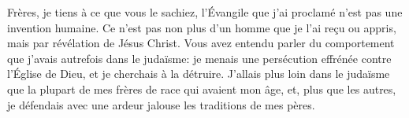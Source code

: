 Frères, je tiens à ce que vous le sachiez,
	l’Évangile que j’ai proclamé n’est pas une invention humaine.
Ce n’est pas non plus d’un homme que je l’ai reçu ou appris,
	mais par révélation de Jésus Christ.
Vous avez entendu parler du comportement que j’avais autrefois dans le judaïsme:
	je menais une persécution effrénée contre l’Église de Dieu,
	et je cherchais à la détruire.
J’allais plus loin dans le judaïsme
		que la plupart de mes frères de race qui avaient mon âge,
	et, plus que les autres,
	je défendais avec une ardeur jalouse les traditions de mes pères.
